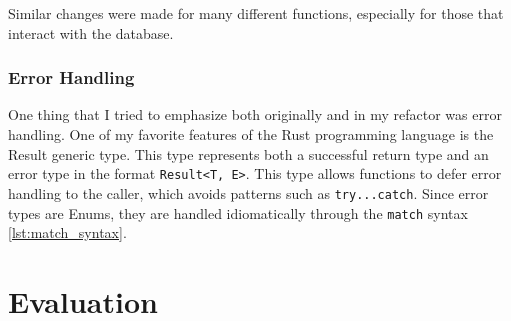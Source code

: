 \documentclass{paper}
\begin{document}




Similar changes were made for many different functions, especially for those that interact with the database.

\subsubsection{Error Handling}
One thing that I tried to emphasize both originally and in my refactor was error handling.
One of my favorite features of the Rust programming language is the Result generic type.
This type represents both a successful return type and an error type in the format \texttt{Result<T, E>}.
This type allows functions to defer error handling to the caller, which avoids patterns such as \texttt{try...catch}.
Since error types are Enums, they are handled idiomatically through the \texttt{match} syntax \cref{lst:match_syntax}.



\section{Evaluation}
\label{sec:eval}


\label{mylastpage}
\newpage
\pagestyle{frontorback}

\newpage
\listoffigures
\vspace{1cm}
\listofsnippets
\vspace{1cm}
{}
\printbibliography
\thispagestyle{frontorback}
\end{document}
